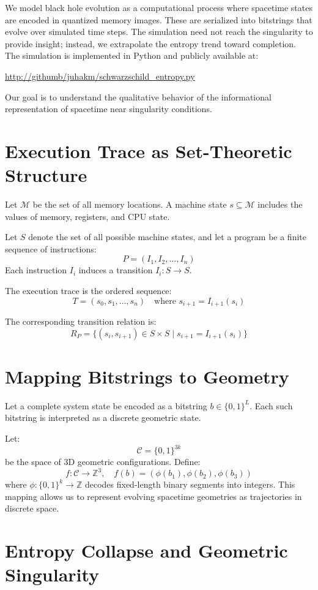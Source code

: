 \documentclass[11pt]{article}
\begin{document}
We model black hole evolution as a computational process where spacetime states are encoded in quantized memory images. These are serialized into bitstrings that evolve over simulated time steps. The simulation need not reach the singularity to provide insight; instead, we extrapolate the entropy trend toward completion. The simulation is implemented in Python and publicly available at:

\url{http://githumb/juhakm/schwarzschild_entropy.py}

Our goal is to understand the qualitative behavior of the informational representation of spacetime near singularity conditions.

\section{Execution Trace as Set-Theoretic Structure}

Let $\mathcal{M}$ be the set of all memory locations. A machine state $s \subseteq \mathcal{M}$ includes the values of memory, registers, and CPU state.

Let $S$ denote the set of all possible machine states, and let a program be a finite sequence of instructions:
\[
  P = (I_1, I_2, \dots, I_n)
\]
Each instruction $I_i$ induces a transition $I_i : S \to S$.

The execution trace is the ordered sequence:
\[
  T = (s_0, s_1, \dots, s_n) \quad \text{where } s_{i+1} = I_{i+1}(s_i)
\]

The corresponding transition relation is:
\[
  R_P = \{ (s_i, s_{i+1}) \in S \times S \mid s_{i+1} = I_{i+1}(s_i) \}
\]

\section{Mapping Bitstrings to Geometry}

Let a complete system state be encoded as a bitstring $b \in \{0,1\}^L$. Each such bitstring is interpreted as a discrete geometric state.

Let:
\[
  \mathcal{C} = \{0,1\}^{3k}
\]
be the space of 3D geometric configurations. Define:
\[
  f : \mathcal{C} \to \mathbb{Z}^3, \quad f(b) = (\phi(b_1), \phi(b_2), \phi(b_3))
\]
where $\phi : \{0,1\}^k \to \mathbb{Z}$ decodes fixed-length binary segments into integers. This mapping allows us to represent evolving spacetime geometries as trajectories in discrete space.

\section{Entropy Collapse and Geometric Singularity}
\end{document}
